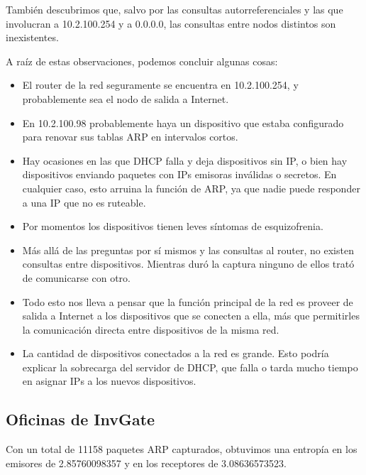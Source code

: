 También descubrimos que, salvo por las consultas autorreferenciales y las que
involucran a 10.2.100.254 y a 0.0.0.0, las consultas entre nodos distintos son
inexistentes.

A raíz de estas observaciones, podemos concluir algunas cosas:
\begin{itemize}
  \item El router de la red seguramente se encuentra en 10.2.100.254, y
probablemente sea el nodo de salida a Internet.
  \item En 10.2.100.98 probablemente haya un dispositivo que estaba configurado
para renovar sus tablas ARP en intervalos cortos.
  \item Hay ocasiones en las que DHCP falla y deja dispositivos sin IP, o bien
hay dispositivos enviando paquetes con IPs emisoras inválidas o secretos. En
cualquier caso, esto arruina la función de ARP, ya que nadie puede
responder a una IP que no es ruteable.
  \item Por momentos los dispositivos tienen leves síntomas de
esquizofrenia.
  \item Más allá de las preguntas por sí mismos y las consultas al router, no
existen consultas entre dispositivos. Mientras duró la captura ninguno de ellos
trató de comunicarse con otro.
  \item Todo esto nos lleva a pensar que la función principal de la red es
proveer de salida a Internet a los dispositivos que se conecten a ella, más que
permitirles la comunicación directa entre dispositivos de la misma red.
  \item La cantidad de dispositivos conectados a la red es grande.  Esto podría
explicar la sobrecarga del servidor de DHCP, que falla o tarda mucho tiempo en
asignar IPs a los nuevos dispositivos. 
\end{itemize}

\newpage
\subsection{Oficinas de InvGate}
Con un total de 11158 paquetes ARP capturados, obtuvimos una entropía en los
emisores de 2.85760098357 y en los receptores de 3.08636573523.

